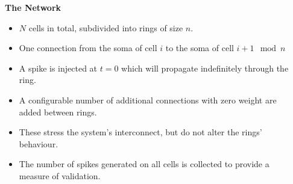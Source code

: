 \documentclass{beamer}
\begin{document}
\begin{frame}[t, fragile]
\begin{columns}[t]
\begin{column}[T]{0.45\textwidth}
    \end{column}
    \begin{column}[T]{0.25\textwidth}
      \textbf{The Network}
      \begin{itemize}
        \item $N$ cells in total, subdivided into rings of size $n$.
        \item One connection from the soma of cell $i$ to the soma of cell $i + 1 \mod n$
        \item A spike is injected at $t=0$ which will propagate indefinitely through the ring.
        \item A configurable number of additional connections with zero weight
              are added between rings.
        \item These stress the system's interconnect, but do not alter the
              rings' behaviour.
        \item The number of spikes generated on all cells is collected to
              provide a measure of validation.
      \end{itemize}
    \end{column}
  \end{columns}


\end{frame}
\end{document}
